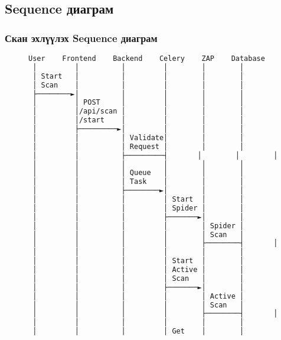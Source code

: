 \documentclass[main.tex]{subfiles}
\begin{document}
\subsection{Sequence диаграм}

\subsubsection{Скан эхлүүлэх Sequence диаграм}

\begin{figure}[h]
\centering
\begin{lstlisting}[language=bash, caption=Start Scan Sequence диаграм]
User    Frontend    Backend    Celery    ZAP    Database    AI
 │         │          │         │        │        │        │
 │ Start   │          │         │        │        │        │
 │ Scan    │          │         │        │        │        │
 ├────────►│          │         │        │        │        │
 │         │ POST     │         │        │        │        │
 │         │/api/scan │         │        │        │        │
 │         │/start    │         │        │        │        │
 │         ├─────────►│         │        │        │        │
 │         │          │ Validate│        │        │        │
 │         │          │ Request │        │        │        │
 │         │          ├─────────┤       │        │        │
 │         │          │         │        │        │        │
 │         │          │ Queue   │        │        │        │
 │         │          │ Task    │        │        │        │
 │         │          ├────────►│        │        │        │
 │         │          │         │ Start  │        │        │
 │         │          │         │ Spider │        │        │
 │         │          │         ├───────►│        │        │
 │         │          │         │        │ Spider │        │
 │         │          │         │        │ Scan   │        │
 │         │          │         │        ├────────┤       │
 │         │          │         │        │        │        │
 │         │          │         │ Start  │        │        │
 │         │          │         │ Active │        │        │
 │         │          │         │ Scan   │        │        │
 │         │          │         ├───────►│        │        │
 │         │          │         │        │ Active │        │
 │         │          │         │        │ Scan   │        │
 │         │          │         │        ├────────┤       │
 │         │          │         │        │        │        │
 │         │          │         │ Get    │        │        │

\end{lstlisting}
\end{figure}
\end{document}
